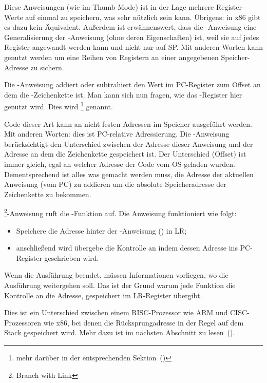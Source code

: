Diese Anweisungen (wie \PUSH im Thumb-Mode) ist in der Lage mehrere Register-Werte auf einmal zu speichern,
was sehr nützlich sein kann. Übrigens: in x86 gibt es dazu kein Äquivalent.
Außerdem ist erwähnenswert, dass die -Anweisung eine Generalisierung der \PUSH-Anweisung
(ohne deren Eigenschaften) ist, weil sie auf jedes Register angewandt werden kann und nicht nur auf \ac{SP}.
Mit anderen Worten kann  genutzt werden um eine Reihen von Registern an einer angegebenen
Speicher-Adresse zu sichern.

\myindex{\PICcode}
Die -Anweisung addiert oder subtrahiert den Wert im \ac{PC}-Register zum Offset
an dem die -Zeichenkette ist.
Man kann sich nun fragen, wie das -Register hier genutzt wird.
Dies wird \q{\PICcode}\footnote{mehr darüber in der entsprechenden Sektion~()} genannt.

Code dieser Art kann an nicht-festen Adressen im Speicher ausgeführt werden.
Mit anderen Worten: dies ist \ac{PC}-relative Adressierung.
Die -Anweisung berücksichtigt den Unterschied zwischen der Adresse dieser Anweisung und der Adresse
an dem die Zeichenkette gespeichert ist.
Der Unterschied (Offset) ist immer gleich, egal an welcher Adresse der Code vom \ac{OS} geladen wurden.
Dementsprechend ist alles was gemacht werden muss, die Adresse der aktuellen Anweisung (vom \ac{PC})
zu addieren um die absolute Speicheradresse der Zeichenkette zu bekommen.

\footnote{Branch with Link}-Anweisung ruft die \printf-Funktion auf. 
Die Anweisung funktioniert wie folgt:

\begin{itemize}
\item Speichere die Adresse hinter der -Anweisung () in \ac{LR};
\item anschließend wird übergebe die Kontrolle an \printf indem dessen Adresse ins \ac{PC}-Register geschrieben wird.
\end{itemize}

Wenn \printf die Ausführung beendet, müssen Informationen vorliegen, wo die Ausführung weitergehen soll.
Das ist der Grund warum jede Funktion die Kontrolle an die Adresse, gespeichert im \ac{LR}-Register übergibt.

Dies ist ein Unterschied zwischen einem  \ac{RISC}-Prozessor wie ARM und \ac{CISC}-Prozessoren wie x86,
bei denen die Rücksprungadresse in der Regel auf dem Stack gespeichert wird.
Mehr dazu ist im nächsten Abschnitt zu lesen~().

